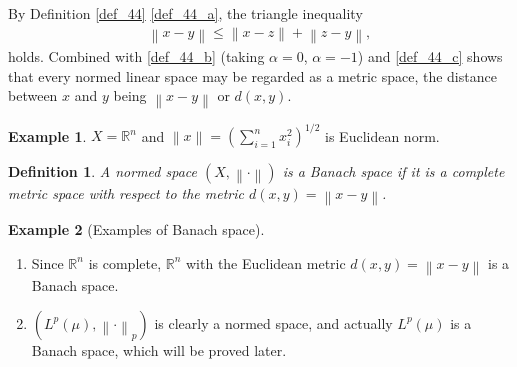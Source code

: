 \documentclass[11pt]{book}
\newtheorem{definition}{Definition}[chapter]
\theoremstyle{definition}
\newtheorem{example}{Example}[chapter]
\numberwithin{equation}{chapter}
\begin{document}
By Definition \ref{def_44} \ref{def_44_a}, the triangle inequality
\begin{align*}
    \left\|x - y\right\| \leq \left\|x - z\right\| + \left\|z - y\right\|,
\end{align*}
holds. Combined with \ref{def_44_b} (taking $\alpha = 0$, $\alpha = -1$) and \ref{def_44_c} shows that every normed linear space may be regarded as a metric space, the distance between $x$ and $y$ being $\left\|x - y\right\|$ or $d(x,y)$. 
\medskip

\begin{example}
$X = \mathbb{R}^n$ and $\left\|x\right\| = \left(\sum^n_{i=1}x_i^2\right)^{1/2}$ is Euclidean norm. 
\end{example}

\medskip

\begin{definition}
A normed space $(X, \left\|\cdot\right\|)$ is a Banach space if it is a complete metric space with respect to the metric $d(x,y) = \left\|x - y\right\|$.
\end{definition}

\medskip

\begin{example}[Examples of Banach space]
~\begin{enumerate}[label=(\alph*)]
    \item Since $\mathbb{R}^n$ is complete, $\mathbb{R}^n$ with the Euclidean metric $d(x,y) = \left\|x - y\right\|$ is a Banach space.
    
    \item $(L^p(\mu), \left\|\cdot\right\|_p)$ is clearly a normed space, and actually $L^p(\mu)$ is a Banach space, which will be proved later.
\end{enumerate}
\end{example}

\medskip
\end{document}
